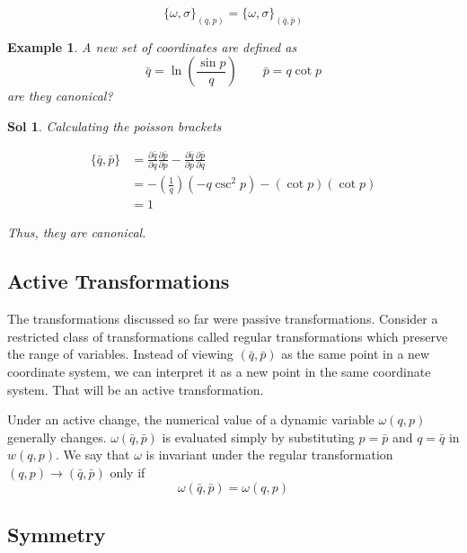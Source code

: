 \documentclass[12pt,a4paper]{report}
\newcommand{\parder}[2]{\frac{\partial#1}{\partial#2}}
\newtheorem{example}{Example}[section]
\newtheorem*{solution}{Sol}
\begin{document}
\begin{equation*}
    \{\omega, \sigma\}_{(q, p)} = \{\omega, \sigma\}_{(\bar{q}, \bar{p})}
\end{equation*}

\begin{example}
    A new set of coordinates are defined as
    \begin{equation*}
        \bar{q} = \ln\left( \frac{\sin p}{q} \right) \qquad \bar{p} = q\cot p
    \end{equation*}
    are they canonical?
\end{example}

\begin{solution}
    Calculating the poisson brackets

    \begin{align*}
        \{\bar{q}, \bar{p}\} &= \parder{\bar{q}}{q} \parder{\bar{p}}{p} - \parder{\bar{q}}{p} \parder{\bar{p}}{q} \\
        &= -\left(\frac{1}{q}\right)(-q\csc^2p) - (\cot p) (\cot p) \\
        &= 1
    \end{align*}

    Thus, they are canonical.
\end{solution}

\subsection{Active Transformations}

The transformations discussed so far were passive transformations. Consider a restricted class of transformations called regular transformations which preserve the range of variables.
Instead of viewing $(\bar{q}, \bar{p})$ as the same point in a new coordinate system, we can interpret it as a new point in the same coordinate system. That will be an active transformation.

Under an active change, the numerical value of a dynamic variable $\omega(q, p)$ generally changes. $\omega(\bar{q}, \bar{p})$ is evaluated simply by substituting $p=\bar{p}$ and $q=\bar{q}$ in $w(q, p)$.
We say that $\omega$ is invariant under the regular transformation $(q, p) \to (\bar{q}, \bar{p})$ only if
\begin{equation*}
    \omega(\bar{q}, \bar{p}) = \omega(q, p)
\end{equation*}

\subsection{Symmetry}
\end{document}

